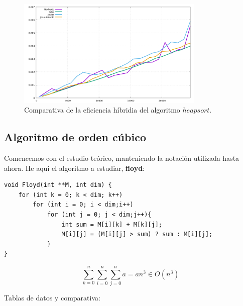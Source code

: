 \documentclass[11pt,a4paper]{article}
\begin{document}
\begin{figure}[H]
	\centering
	\includegraphics[width=0.8\textwidth]{../plots/heapsort}
	\caption{Comparativa de la eficiencia híbridia del algoritmo $heapsort$.}
\end{figure}

\subsection{Algoritmo de orden cúbico}

Comencemos con el estudio teórico, manteniendo la notación utilizada hasta ahora. He aqui el algoritmo a estudiar, \textbf{floyd}:

\begin{lstlisting}
void Floyd(int **M, int dim) {
	for (int k = 0; k < dim; k++)
		for (int i = 0; i < dim;i++)
			for (int j = 0; j < dim;j++){
				int sum = M[i][k] + M[k][j];    	
				M[i][j] = (M[i][j] > sum) ? sum : M[i][j];
			}
}	     	
\end{lstlisting}

$$\sum_{k=0}^{n} \sum_{i=0}^{n} \sum_{j=0}^{n} a = a n^3 \in O(n^3)$$

Tablas de datos y comparativa:
\end{document}

